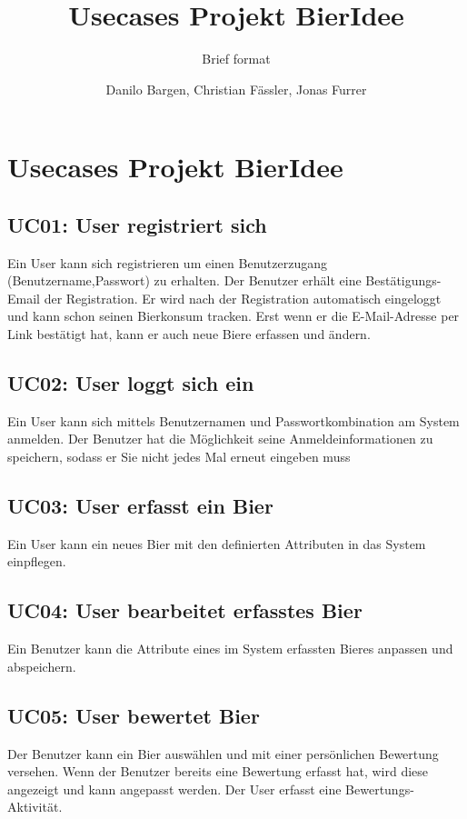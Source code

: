 \documentclass[10pt,a4paper]{scrartcl}
\author{Danilo Bargen, Christian Fässler, Jonas Furrer}
\title{Usecases Projekt BierIdee}
\subtitle{Brief format}
\begin{document}
\begin{titlepage}
	\maketitle
	\vspace{120mm}
	\thispagestyle{empty} %
\end{titlepage}



\section{Usecases Projekt BierIdee}

\subsection*{UC01: User registriert sich}
Ein User kann sich registrieren um einen Benutzerzugang (Benutzername,Passwort) zu erhalten. Der Benutzer erhält eine Bestätigungs-Email der Registration. Er wird nach der Registration automatisch eingeloggt und kann schon seinen Bierkonsum tracken. Erst wenn er die E-Mail-Adresse per Link bestätigt hat, kann er auch neue Biere erfassen und ändern.
\subsection*{UC02: User loggt sich ein}
Ein User kann sich mittels Benutzernamen und Passwortkombination am System anmelden.
Der Benutzer hat die Möglichkeit seine Anmeldeinformationen zu speichern, sodass er Sie nicht jedes Mal erneut eingeben muss
\subsection*{UC03: User erfasst ein Bier}
Ein User kann ein neues Bier mit den definierten Attributen in das System einpflegen.
\subsection*{UC04: User bearbeitet erfasstes Bier}
Ein Benutzer kann die Attribute eines im System erfassten Bieres anpassen und abspeichern.
\subsection*{UC05: User bewertet Bier}
Der Benutzer kann ein Bier auswählen und mit einer persönlichen Bewertung versehen. Wenn der Benutzer bereits eine Bewertung erfasst hat, wird diese angezeigt und kann angepasst werden. Der User erfasst eine Bewertungs-Aktivität.
\end{document}
